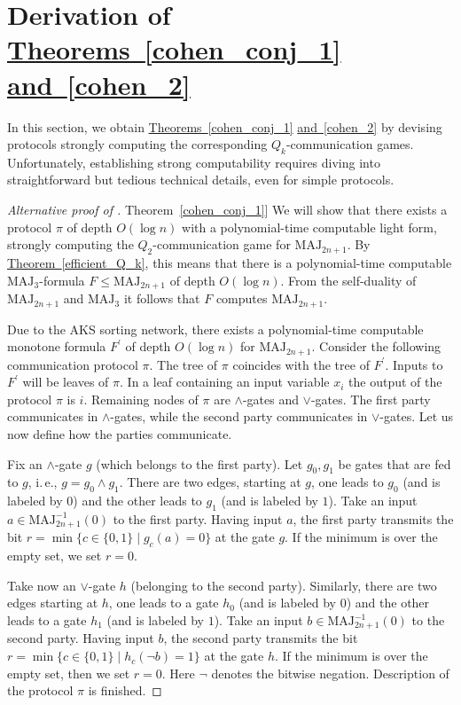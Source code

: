 \documentclass[11pt]{article}
\numberwithin{equation}{section}
\theoremstyle{definition}
\theoremstyle{plain}
\newcommand{\ie}{i.\,e.}
\newcommand{\expref}[2]{\hyperref[#2]{#1~\ref{#2}}}
\def\MAJ{\mathrm{MAJ}}
\begin{document}
\section{Derivation of \expref{Theorems}{cohen_conj_1} \expref{and}{cohen_2}} \label{sec:corol}

In this section, we obtain \expref{Theorems}{cohen_conj_1} \expref{and}{cohen_2} by devising protocols  strongly computing the corresponding $Q_k$-communication games. Unfortunately, establishing strong computability requires diving into straightforward but tedious technical details, even for simple protocols.  

\begin{proof}[Alternative proof of \expref{Theorem}{cohen_conj_1}]
 We will show that there exists 
%
a protocol $\pi$ of depth $O(\log n)$  %
with a polynomial-time computable light form, strongly computing the $Q_2$-communication game for $\MAJ_{2n + 1}$. By \expref{Theorem}{efficient_Q_k}, this means that there is a polynomial-time computable 
%
$\MAJ_3$-formula $F \le \MAJ_{2n + 1}$ 
of depth $O(\log n)$.
{}From the self-duality of $\MAJ_{2n + 1}$ and $\MAJ_3$ it follows that $F$ computes $\MAJ_{2n + 1}$. 

Due to the AKS sorting network, there exists a polynomial-time computable 
%
monotone formula $F^\prime$
of depth $O(\log n)$  %
for $\MAJ_{2n  + 1}$. Consider the following communication protocol $\pi$.
The tree of $\pi$ coincides with the tree of $F^\prime$. Inputs to $F^\prime$ will be leaves of $\pi$. In a leaf containing an input variable $x_i$ the output of the protocol $\pi$ is $i$. Remaining nodes of $\pi$ are $\land$-gates and $\lor$-gates. The first party communicates in $\land$-gates, while the second party communicates in $\lor$-gates. Let us now define how the parties communicate.

Fix an  $\land$-gate $g$ (which belongs to the first party). Let $g_0, g_1$ be gates that are fed to $g$, \ie, $g = g_0 \land g_1$. There are two edges, starting at $g$, one leads to $g_0$ (and is labeled by $0$) and the other leads to $g_1$ (and is labeled by $1$). Take an input $a\in \MAJ_{2n + 1}^{-1}(0)$ to the first party. Having  input $a$, the first party transmits the bit $r  = \min\{ c \in \{0, 1\} \mid g_c(a) = 0\}$  at the gate $g$. If the minimum is over the empty set, we set $r = 0$. 

Take now an $\lor$-gate $h$ (belonging to the second party). Similarly, there are two edges starting at $h$, one leads to a gate $h_0$ (and is labeled by $0$) and the other leads to a gate $h_1$ (and is labeled by $1$). Take an input $b\in \MAJ_{2n + 1}^{-1}(0)$ to the second party. Having input $b$, the second party transmits the bit $r  = \min\{ c \in \{0, 1\} \mid h_c(\lnot b) = 1\}$ at the gate $h$.  If the minimum is over the empty set, then we set $r = 0$. Here $\lnot$ denotes the %
bitwise  %
negation. Description of the protocol $\pi$ is finished.


\end{proof}
\end{document}
